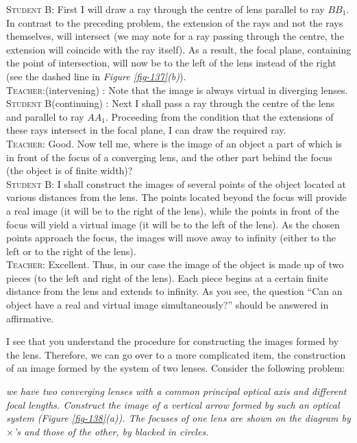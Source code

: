 \documentclass[a4paper,sfsidenotes]{tufte-book}
\begin{document}
\textsc{Student B:} First I will draw a ray through the centre of lens parallel to ray $BB_{1}$. In contrast to the preceding problem, the extension of the rays and not the rays themselves, will intersect (we may note for a ray passing through the centre, the extension will coincide with the ray itself). As a result, the focal plane, containing the point of intersection, will now be to the left of the lens instead of the right (see the dashed line in \emph{Figure \ref{fig-137}(b)}).
\\
\textsc{Teacher:}(intervening) : Note that the image is always virtual in diverging lenses.
\\
\textsc{Student B}(continuing) : Next I shall pass a ray through the centre of the lens and parallel to ray $AA_{1}$. Proceeding from the condition that the extensions of these rays intersect in the focal plane, I can draw the required ray.  
\\
\textsc{Teacher:} Good. Now tell me, where is the image of an object a part of which is in front of the focus of a converging lens, and the other part behind the focus (the object is of finite width)?
\\
\textsc{Student B:} I shall construct the images of several points of the object located at various distances from the lens. The points located beyond the focus will provide a real image (it will be to the right of the lens), while the points in front of the focus will yield a virtual image (it will be to the left of the lens). As the chosen points approach the focus, the images will move away to infinity (either to the left or to the right of the lens).
\\
\textsc{Teacher:} Excellent. Thus, in our case the image of the object is made up of two pieces (to the left and right of the lens). Each piece begins at a certain finite distance from the lens and extends to infinity. As you see, the question ``Can an object have a real and virtual image simultaneously?'' should be answered in affirmative. 

I see that you understand the procedure for constructing the images formed by the lens. Therefore, we can go over to a more complicated item, the construction of an image formed by the system of two lenses. Consider the following problem:

 \emph{we have two converging lenses with a common principal optical axis and different focal lengths. Construct the image of a vertical arrow formed by such an optical system (\emph{Figure \ref{fig-138}(a)}). The focuses of one lens are shown on the diagram by $\times$'s and those of the other,  by blacked in circles.}
\end{document}
